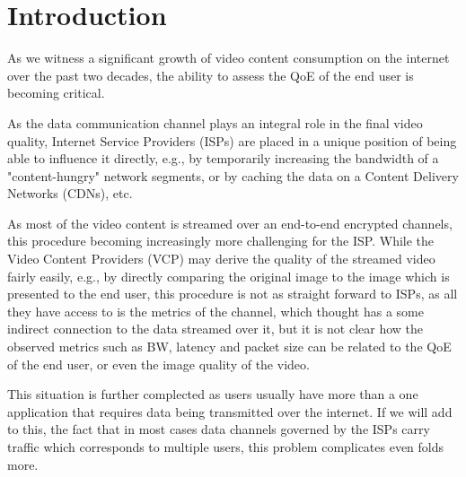 \section{Introduction}
As we witness a significant growth of video content consumption on the internet over the past two decades, the ability to assess the QoE of the end user is becoming critical.



As the data communication channel plays an integral role in the final video quality, Internet Service Providers (ISPs) are placed in a unique position of being able to influence it directly, e.g., by temporarily increasing the bandwidth of a "content-hungry" network segments, or by caching the data on a Content Delivery Networks (CDNs), etc.

As most of the video content is streamed over an end-to-end encrypted channels, this procedure becoming increasingly more challenging for the ISP. While the Video Content Providers (VCP) may derive the quality of the streamed video fairly easily, e.g., by directly comparing the original image to the image which is presented to the end user, this procedure is not as straight forward to ISPs, as all they have access to is the metrics of the channel, which thought has a some indirect connection to the data streamed over it, but it is not clear how the observed metrics such as BW, latency and packet size can be related to the QoE of the end user, or even the image quality of the video.

This situation is further complected as users usually have more than a one application that requires data being transmitted over the internet. If we will add to this, the fact that in most cases data channels governed by the ISPs carry traffic which corresponds to multiple users, this problem complicates even folds more.

